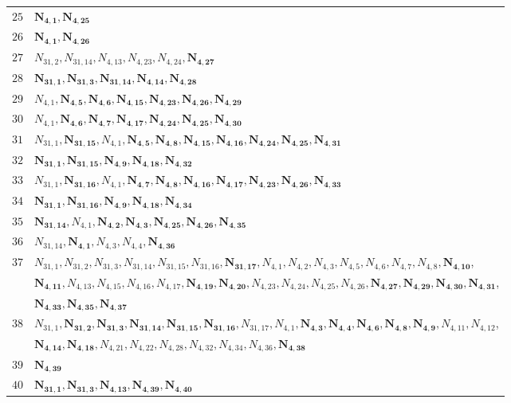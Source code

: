 \documentclass{amsart}
\theoremstyle{plain}
\theoremstyle{definition}
\theoremstyle{remark}
\begin{document}
{\begin{longtable}{ll}
$25$ & $\bm{N_{4,1}}, \bm{N_{4,25}}$\\
$26$ & $\bm{N_{4,1}}, \bm{N_{4,26}}$\\
$27$ & $N_{31,2}, N_{31,14}, N_{4,13}, N_{4,23}, N_{4,24}, \bm{N_{4,27}}$\\
$28$ & $\bm{N_{31,1}}, \bm{N_{31,3}}, \bm{N_{31,14}}, \bm{N_{4,14}}, \bm{N_{4,28}}$\\
$29$ & $N_{4,1}, \bm{N_{4,5}}, \bm{N_{4,6}}, \bm{N_{4,15}}, \bm{N_{4,23}}, \bm{N_{4,26}}, \bm{N_{4,29}}$\\
$30$ & $N_{4,1}, \bm{N_{4,6}}, \bm{N_{4,7}}, \bm{N_{4,17}}, \bm{N_{4,24}}, \bm{N_{4,25}}, \bm{N_{4,30}}$\\
%
$31$ & $N_{31,1}, \bm{N_{31,15}}, N_{4,1}, \bm{N_{4,5}}, \bm{N_{4,8}}, \bm{N_{4,15}}, \bm{N_{4,16}}, \bm{N_{4,24}}, \bm{N_{4,25}}, \bm{N_{4,31}}$\\
$32$ & $\bm{N_{31,1}}, \bm{N_{31,15}}, \bm{N_{4,9}}, \bm{N_{4,18}}, \bm{N_{4,32}}$\\
$33$ & $N_{31,1}, \bm{N_{31,16}}, N_{4,1}, \bm{N_{4,7}}, \bm{N_{4,8}}, \bm{N_{4,16}}, \bm{N_{4,17}}, \bm{N_{4,23}}, \bm{N_{4,26}}, \bm{N_{4,33}}$\\
$34$ & $\bm{N_{31,1}}, \bm{N_{31,16}}, \bm{N_{4,9}}, \bm{N_{4,18}}, \bm{N_{4,34}}$\\
$35$ & $\bm{N_{31,14}}, N_{4,1}, \bm{N_{4,2}}, \bm{N_{4,3}}, \bm{N_{4,25}}, \bm{N_{4,26}}, \bm{N_{4,35}}$\\
$36$ & $N_{31,14}, \bm{N_{4,1}}, N_{4,3}, N_{4,4}, \bm{N_{4,36}}$\\
$37$ & $N_{31,1}, N_{31,2}, N_{31,3}, N_{31,14}, N_{31,15}, N_{31,16}, \bm{N_{31,17}}, N_{4,1}, N_{4,2}, N_{4,3}, N_{4,5}, N_{4,6}, N_{4,7}, N_{4,8}, \bm{N_{4,10}}$,\\
& $\bm{N_{4,11}}, N_{4,13}, N_{4,15}, N_{4,16}, N_{4,17}, \bm{N_{4,19}}, \bm{N_{4,20}}, N_{4,23}, N_{4,24}, N_{4,25}, N_{4,26}, \bm{N_{4,27}}, \bm{N_{4,29}}, \bm{N_{4,30}}, \bm{N_{4,31}}$,\\ 
& $\bm{N_{4,33}}, \bm{N_{4,35}}, \bm{N_{4,37}}$\\
$38$ & $N_{31,1}, \bm{N_{31,2}}, \bm{N_{31,3}}, \bm{N_{31,14}}, \bm{N_{31,15}}, \bm{N_{31,16}}, N_{31,17}, N_{4,1}, \bm{N_{4,3}}, \bm{N_{4,4}}, \bm{N_{4,6}}, \bm{N_{4,8}}, \bm{N_{4,9}}, N_{4,11}, N_{4,12}$,\\ 
& $\bm{N_{4,14}}, \bm{N_{4,18}}, N_{4,21}, N_{4,22}, N_{4,28}, N_{4,32}, N_{4,34}, N_{4,36}, \bm{N_{4,38}}$\\
$39$ & $\bm{N_{4,39}}$\\
$40$ & $\bm{N_{31,1}}, \bm{N_{31,3}}, \bm{N_{4,13}}, \bm{N_{4,39}}, \bm{N_{4,40}}$\\

\end{longtable}}
\end{document}
